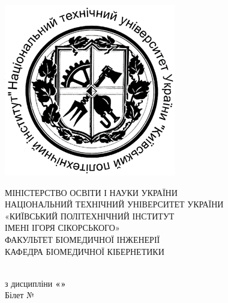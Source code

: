 \begin{titlepage}
    \begin{minipage}{\textwidth}
        \begin{minipage}{0.3\textwidth}
            \includegraphics[width=\textwidth]{./images/kpi}
        \end{minipage}
        \hfill
        \begin{minipage}{0.7\textwidth}
            \centering
            \Large
            МІНІСТЕРСТВО ОСВІТИ І НАУКИ УКРАЇНИ \\
            НАЦІОНАЛЬНИЙ ТЕХНІЧНИЙ УНІВЕРСИТЕТ УКРАЇНИ \\
            «КИЇВСЬКИЙ ПОЛІТЕХНІЧНИЙ ІНСТИТУТ \\
            ІМЕНІ ІГОРЯ СІКОРСЬКОГО» \\
            ФАКУЛЬТЕТ БІОМЕДИЧНОЇ ІНЖЕНЕРІЇ \\
            КАФЕДРА БІОМЕДИЧНОЇ КІБЕРНЕТИКИ
        \end{minipage}
    \end{minipage}

    \vfill

    \begin{center}
        \LARGE
        \textbf{\TITLE} \\
        з дисципліни \textbf{«\DISCIPLINE»} \\
        Білет №\VARIANT
    \end{center}


\end{titlepage}
